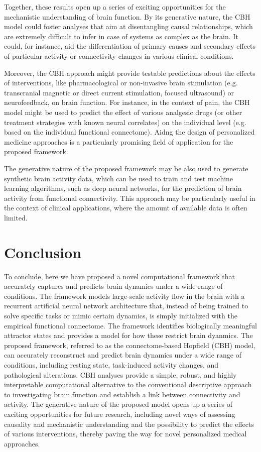 \documentclass{article}
\begin{document}
Together, these results open up a series of exciting opportunities for the mechanistic understanding of brain function. By its generative nature, the CBH model could foster analyses that aim at disentangling causal relationships, which are extremely difficult to infer in case of systems as complex as the brain. It could, for instance, aid the differentiation of primary causes and secondary effects of particular activity or connectivity changes in various clinical conditions.

Moreover, the CBH approach might provide testable predictions about the effects of interventions, like pharmacological or non-invasive brain stimulation (e.g. transcranial magnetic or direct current stimulation, focused ultrasound) or neurofeedback, on brain function.
For instance, in the context of pain, the CBH model might be used to predict the effect of various analgesic drugs (or other treatment strategies with known neural correlates) on the individual level (e.g. based on the individual functional connectome).
Aidng the design of personalized medicine approaches is a particularly promising field of application for the proposed framework.

The generative nature of the proposed framework may be also used to generate synthetic brain activity data, which can be used to train and test machine learning algorithms, such as deep neural networks, for the prediction of brain activity from functional connectivity. This approach may be particularly useful in the context of clinical applications, where the amount of available data is often limited.

\section{Conclusion}\label{Conclusion}

To conclude, here we have proposed a novel computational framework that accurately captures and predicts brain dynamics under a wide range of conditions.
The framework models large-scale activity flow in the brain with a recurrent artificial neural network architecture that, instead of being trained to solve specific tasks or mimic certain dynamics, is simply initialized with the empirical functional connectome. The framework identifies biologically meaningful attractor states and provides a model for how these restrict brain dyanmics.
The proposed framework, referred to as the connectome-based Hopfield (CBH) model, can accurately reconstruct and predict brain dynamics under a wide range of conditions, including resting state, task-induced activity changes, and pathological alterations.
CBH analyses provide a simple, robust, and highly interpretable computational alternative to the conventional descriptive approach to investigating brain function and establish a link between connectivity and activity.
The generative nature of the proposed model opens up a series of exciting opportunities for future research, including novel ways of assessing causality and mechanistic understanding and the possibility to predict the effects of various interventions, thereby paving the way for novel personalized medical approaches.
\end{document}
